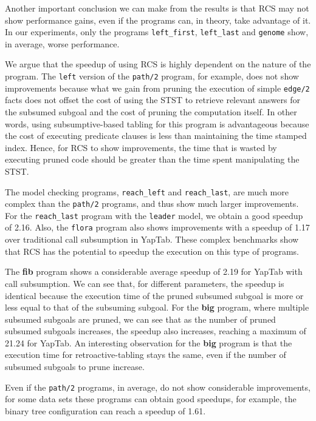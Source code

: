 Another important conclusion we can make from the results is that RCS may not show performance gains, even if the
programs can, in theory, take advantage of it. In our experiments, only the programs \texttt{left\_first},
\texttt{left\_last} and \texttt{genome} show, in average, worse performance.

We argue that the speedup of using RCS is highly dependent on the nature of the program.
The \texttt{left} version
of the \texttt{path/2} program, for example, does not show improvements because what we gain from pruning the
execution of simple \texttt{edge/2} facts does not offset the cost of using the STST to retrieve relevant answers
for the subsumed subgoal and
the cost of pruning the computation itself. In other words, using subsumptive-based tabling for this program is
advantageous because the cost of executing predicate clauses is less than maintaining the time stamped index.
Hence, for RCS to show improvements, the time that is wasted by executing pruned code should be greater than the
time spent manipulating the STST.

The model checking programs, \texttt{reach\_left} and \texttt{reach\_last}, are much more complex than the \texttt{path/2}
programs, and thus show much larger improvements. For the \texttt{reach\_last} program with the \texttt{leader} model,
we obtain a good speedup of 2.16. Also, the \texttt{flora} program also shows improvements with a speedup of 1.17 over
traditional call subsumption in YapTab. These complex benchmarks show that RCS has the potential to speedup the
execution on this type of programs.

The \textbf{fib} program shows a considerable average speedup of 2.19 for YapTab with call subsumption.
We can see that, for different parameters, the speedup is identical because the execution time of the pruned subsumed
subgoal is more or less equal to that of the subsuming subgoal. For the \textbf{big} program, where multiple
subsumed subgoals are pruned, we can see that as the number of pruned subsumed subgoals increases, the speedup
also increases, reaching a maximum of 21.24 for YapTab. An interesting observation for the \textbf{big} program is
that the execution time for retroactive-tabling stays the same, even if the number of subsumed subgoals to prune
increase.

Even if the \texttt{path/2} programs, in average, do not show considerable improvements, for some data sets
these programs can obtain good speedups, for example, the binary tree configuration can reach a speedup of 1.61.

